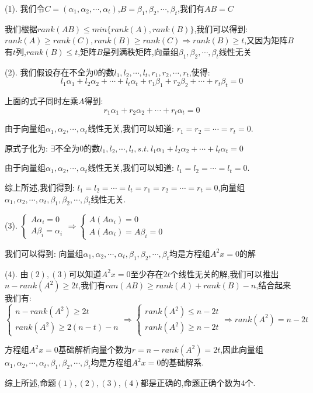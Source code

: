 \begin{solution}

	(1). 我们令$C=(\alpha_{1},\alpha_{2},\cdots,\alpha_{t})$,$B=\beta_{1},\beta_{2},\cdots,\beta_{t}$,我们有$AB=C$
	
	我们根据$rank(AB)\leq min\{rank(A),rank(B)\}$,我们可以得到:  
	$rank(A)\geq rank(C),rank(B)\geq rank(C)\Rightarrow rank(B)\geq t$,又因为矩阵$B$有$t$列,$rank(B)\leq t$,矩阵$B$是列满秩矩阵,向量组$\beta_{1},\beta_{2},\cdots,\beta_{t}$线性无关
	
	(2). 我们假设存在不全为$0$的数$l_{1},l_{2},\cdots,l_{t},r_{1},r_{2},\cdots,r_{t}$,使得:  
	$$l_{1}\alpha_{1}+l_{2}\alpha_{2}+\cdots+l_{t}\alpha_{t}+r_{1}\beta_{1}+r_{2}\beta_{2}+\cdots+r_{t}\beta_{t}=0$$
	
	上面的式子同时左乘$A$得到:  
	$$r_{1}\alpha_{1}+r_{2}\alpha_{2}+\cdots+r_{t}\alpha_{t}=0$$
	
	由于向量组$\alpha_{1},\alpha_{2},\cdots,\alpha_{t}$线性无关,我们可以知道:  $r_{1}=r_{2}=\cdots=r_{t}=0$.
	
	原式子化为:  $\exists\text{不全为}0\text{的数}l_{1},l_{2},\cdots,l_{t}, s.t.\ l_{1}\alpha_{1}+l_{2}\alpha_{2}+\cdots+l_{t}\alpha_{t}=0$
	
	由于向量组$\alpha_{1},\alpha_{2},\cdots,\alpha_{t}$线性无关,我们可以知道:  $l_{1}=l_{2}=\cdots=l_{t}=0$.
	
	综上所述,我们得到:  $l_{1}=l_{2}=\cdots=l_{t}=r_{1}=r_{2}=\cdots=r_{t}=0$,向量组$\alpha_{1},\alpha_{2},\cdots,\alpha_{t},\beta_{1},\beta_{2},\cdots,\beta_{t}$线性无关.
	
	(3). $\left\lbrace
	\begin{array}{l}
		A\alpha_{i}=0\\
		A\beta_{i}=\alpha_{i}
	\end{array}
	\right. \Rightarrow \left\lbrace
	\begin{array}{l}
		A(A\alpha_{i})=0\\
		A(A\alpha_{i})=A\beta_{i}=0
	\end{array}
	\right. $
	
	我们可以得到:  向量组$\alpha_{1},\alpha_{2},\cdots,\alpha_{t},\beta_{1},\beta_{2},\cdots,\beta_{t}$均是方程组$A^2x=0$的解
	
	(4). 由$(2),(3)$可以知道$A^2x=0$至少存在$2t$个线性无关的解,我们可以推出$n-rank(A^2)\geq 2t$,我们有$ran(AB)\geq rank(A)+rank(B)-n$,结合起来我们有:  
	$$\left\lbrace
	\begin{array}{l}
		n-rank(A^2)\geq 2t\\
		rank(A^2)\geq 2(n-t)-n
	\end{array}
	\right. \Rightarrow \left\lbrace
	\begin{array}{l}
		rank(A^2)\leq n-2t\\
		rank(A^2)\geq n-2t
	\end{array}
	\right. \Rightarrow rank(A^2)=n-2t$$
	
	方程组$A^2x=0$基础解析向量个数为$r=n-rank(A^2)=2t$,因此向量组$\alpha_{1},\alpha_{2},\cdots,\alpha_{t},\beta_{1},\beta_{2},\cdots,\beta_{t}$均是方程组$A^2x=0$的基础解系.
	
	综上所述,命题$(1),(2),(3),(4)$都是正确的,命题正确个数为$4$个.
\end{solution}

